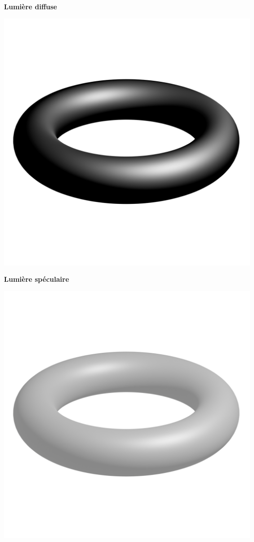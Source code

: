 \documentclass[11pt,class=report,crop=false]{standalone}
\begin{document}
\begin{center}
\begin{minipage}{0.32\textwidth}
		{\bf \quad Lumière diffuse}
	\end{minipage}
	\begin{minipage}{0.32\textwidth}
		\center
		\includegraphics[scale=\myscale,scale=0.13, trim={0 6cm 0 4cm}, clip]{figures/tore-speculaire}
		
		{\bf \quad Lumière spéculaire}
	\end{minipage}
	
	\begin{minipage}{0.49\textwidth}
		\center
		\includegraphics[scale=\myscale,scale=0.17, trim={0 6cm 0 4cm}, clip]{figures/tore-ambiante-diffuse-speculaire}
		

\end{minipage}
\end{center}
\end{document}
